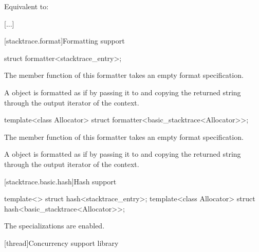 \documentclass{wg21}
\begin{document}
\begin{itemdescr}
    \pnum
    \effects
    Equivalent to: 
\end{itemdescr}

\textcolor{noteclr}{[...]}

\begin{addedblock}

[stacktrace.format]{Formatting support}

\begin{itemdecl}
struct formatter<stacktrace_entry>;
\end{itemdecl}

\begin{itemdescr}
The  member function of this formatter takes an empty format specification.

A  object is formatted as if by passing it to  and copying the returned string through the output iterator of the context.
\end{itemdescr}



\begin{itemdecl}
template<class Allocator>
struct formatter<basic_stacktrace<Allocator>>;
\end{itemdecl}

\begin{itemdescr}
The  member function of this formatter takes an empty format specification.

A  object is formatted as if by passing it to  and copying the returned string through the output iterator of the context.
\end{itemdescr}

\end{addedblock}


[stacktrace.basic.hash]{Hash support}

\begin{itemdecl}
    template<> struct hash<stacktrace_entry>;
    template<class Allocator> struct hash<basic_stacktrace<Allocator>>;
\end{itemdecl}

\begin{itemdescr}
    \pnum
    The specializations are enabled.
\end{itemdescr}

[thread]{Concurrency support library}
\end{document}

